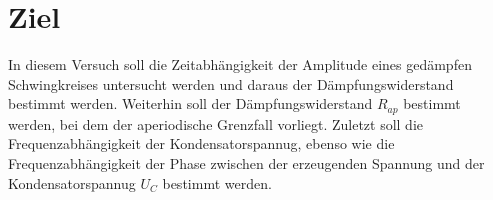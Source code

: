 \section{Ziel}

In diesem Versuch soll die Zeitabhängigkeit der Amplitude eines gedämpfen 
Schwingkreises untersucht werden und daraus der Dämpfungswiderstand bestimmt werden.
Weiterhin soll der Dämpfungswiderstand $R_{ap}$ bestimmt werden, bei dem der 
aperiodische Grenzfall vorliegt. Zuletzt soll die Frequenzabhängigkeit der
Kondensatorspannug, ebenso wie die Frequenzabhängigkeit der Phase zwischen der 
erzeugenden Spannung und der Kondensatorspannug $U_C$ bestimmt werden. 